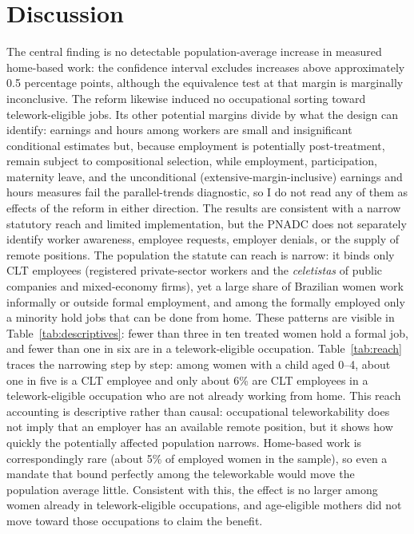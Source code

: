 \documentclass[12pt]{article}
\begin{document}
\section{Discussion}\label{sec:discussion}

The central finding is no detectable population-average increase in measured home-based work: the confidence interval excludes increases above approximately 0.5 percentage points, although the equivalence test at that margin is marginally inconclusive. The reform likewise induced no occupational sorting toward telework-eligible jobs. Its other potential margins divide by what the design can identify: earnings and hours among workers are small and insignificant conditional estimates but, because employment is potentially post-treatment, remain subject to compositional selection, while employment, participation, maternity leave, and the unconditional (extensive-margin-inclusive) earnings and hours measures fail the parallel-trends diagnostic, so I do not read any of them as effects of the reform in either direction. The results are consistent with a narrow statutory reach and limited implementation, but the PNADC does not separately identify worker awareness, employee requests, employer denials, or the supply of remote positions. The population the statute can reach is narrow: it binds only CLT employees (registered private-sector workers and the \emph{celetistas} of public companies and mixed-economy firms), yet a large share of Brazilian women work informally or outside formal employment, and among the formally employed only a minority hold jobs that can be done from home. These patterns are visible in Table~\ref{tab:descriptives}: fewer than three in ten treated women hold a formal job, and fewer than one in six are in a telework-eligible occupation. Table~\ref{tab:reach} traces the narrowing step by step: among women with a child aged 0--4, about one in five is a CLT employee and only about 6\% are CLT employees in a telework-eligible occupation who are not already working from home. This reach accounting is descriptive rather than causal: occupational teleworkability does not imply that an employer has an available remote position, but it shows how quickly the potentially affected population narrows. Home-based work is correspondingly rare (about 5\% of employed women in the sample), so even a mandate that bound perfectly among the teleworkable would move the population average little. Consistent with this, the effect is no larger among women already in telework-eligible occupations, and age-eligible mothers did not move toward those occupations to claim the benefit.
\end{document}
